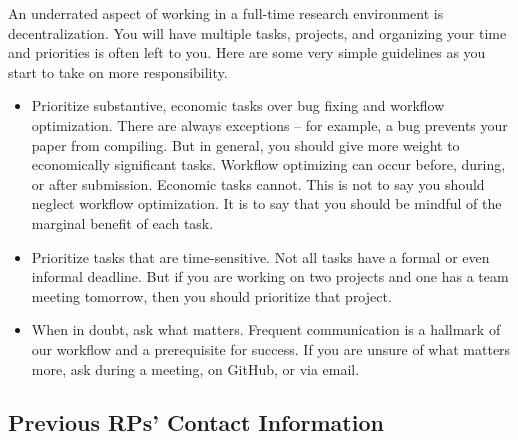 An underrated aspect of working in a full-time research environment is decentralization.
You will have multiple tasks, projects, 
and organizing your time and priorities is often left to you.
Here are some very simple guidelines as you start to take on more responsibility.
\begin{itemize}
    \item Prioritize substantive, economic tasks over bug fixing and workflow optimization. 
         There are always exceptions – for example, a bug prevents your paper from compiling. 
         But in general, you should give more weight to economically significant tasks. 
         Workflow optimizing can occur before, during, or after submission. 
         Economic tasks cannot. 
         This is not to say you should neglect workflow optimization. 
         It is to say that you should be mindful of the marginal benefit of each task.
    \item Prioritize tasks that are time-sensitive.
          Not all tasks have a formal or even informal deadline.
          But if you are working on two projects and one has a team meeting tomorrow, 
          then you should prioritize that project.
    \item When in doubt, ask what matters. 
          Frequent communication is a hallmark of our workflow and a prerequisite for success.
          If you are unsure of what matters more, ask during a meeting, on GitHub, or via email.
\end{itemize} 

\subsection{Previous RPs' Contact Information}

